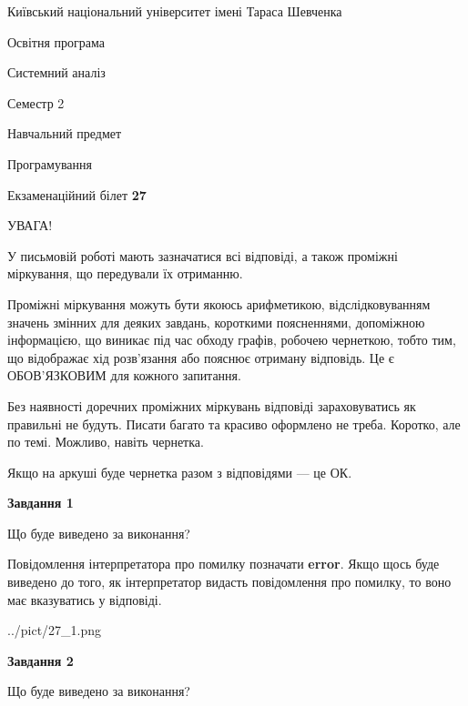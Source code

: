 \documentclass[12pt, ukrainian]{article}
\begin{document}
{{\begin {small}\par
{ \center  Київський національний університет імені Тараса Шевченка \par}
{\parbox {5 cm}{Освітня програма \hfill}{\parbox {7 cm}{Системний аналіз \hfill}}\parbox {6 cm}{\hfill Семестр 2}}\par
{\parbox {5 cm} {Навчальний предмет \hfill}\parbox {7 cm}{Програмування \hfill}\parbox {6cm}{\hfill}\par}\vspace{-7pt} \end{small}}{\center Екзаменаційний білет \No \textbf
{ 27 }\par}}
{
\begin {large}
УВАГА!

У письмовій роботі мають зазначатися всі відповіді, а також проміжні міркування, що передували їх отриманню.

Проміжні міркування можуть бути якоюсь арифметикою, відслідковуванням зна\-чень змінних для деяких завдань,
короткими поясненнями, допоміжною інформацією, що виникає під час обходу графів, робочею чернеткою,
тобто тим, що відображає хід розв’язання або пояснює отриману відповідь.
Це є ОБОВ’ЯЗКОВИМ для кожного запитання.

Без наявності доречних проміжних міркувань відповіді зараховуватись як правиль\-ні не будуть.
Писати багато та красиво оформлено не треба. Коротко, але по темі. Можли\-во, навіть чернетка.

Якщо на аркуші буде чернетка разом з відповідями --- це ОК.

\newpage

{\begin {center}\textbf{Завдання 1}\end {center}}\par
Що буде виведено за виконання?

Повідомлення інтерпретатора про помилку позначати \textbf{error}.
Якщо щось буде виведено до того, як інтерпретатор видасть повідомлення про помилку, 
то воно має вказуватись у відповіді. \par


\begin{center}
	{../pict/27_1.png}
\end{center}
\newpage

{\begin {center}\textbf{Завдання 2}\end {center}}\par
Що буде виведено за виконання?


\end{large}}
\end{document}
